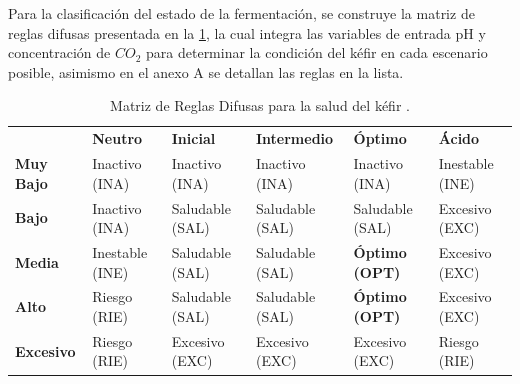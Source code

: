 Para la clasificación del estado de la fermentación, se construye la matriz de reglas difusas 
presentada en la \cref{tab:reglas_co2_ph},
la cual integra las variables de entrada pH y concentración de $CO_{2}$ para determinar la condición 
del kéfir en cada escenario posible, asimismo en el anexo A se detallan las reglas en la lista.
\begin{table}[htbp]
    \centering
    \caption{Matriz de Reglas Difusas para la salud del kéfir .}
    \label{tab:reglas_co2_ph}
    
    \begin{tabularx}{\textwidth}{|>{\centering\arraybackslash}X|>{\centering\arraybackslash}X|>{\centering\arraybackslash}X|>{\centering\arraybackslash}X|>{\centering\arraybackslash}X|>{\centering\arraybackslash}X|}
        \hline
        
        \multirow{2}{*}{\textbf{CO$_2$}} & \multicolumn{5}{c|}{\textbf{pH}} \\
        \cline{2-6}
        
        & \textbf{Neutro} & \textbf{Inicial} & \textbf{Intermedio} & \textbf{Óptimo} & \textbf{Ácido} \\
        \hline
        
        \textbf{Muy Bajo} 
        & Inactivo (INA) 
        & Inactivo (INA) 
        & Inactivo (INA) 
        & Inactivo (INA) 
        & Inestable (INE) \\
        \hline
        
        \textbf{Bajo} 
        & Inactivo (INA) 
        & Saludable (SAL) 
        & Saludable (SAL) 
        & Saludable (SAL) 
        & Excesivo (EXC) \\
        \hline
        
        \textbf{Media} 
        & Inestable (INE) 
        & Saludable (SAL) 
        & Saludable (SAL) 
        & \textbf{Óptimo (OPT)} 
        & Excesivo (EXC) \\
        \hline
        
        \textbf{Alto} 
        & Riesgo (RIE) 
        & Saludable (SAL) 
        & Saludable (SAL) 
        & \textbf{Óptimo (OPT)} 
        & Excesivo (EXC) \\
        \hline
        
        \textbf{Excesivo} 
        & Riesgo (RIE) 
        & Excesivo (EXC) 
        & Excesivo (EXC) 
        & Excesivo (EXC) 
        & Riesgo (RIE) \\ 
        \hline
    \end{tabularx}
\end{table}

